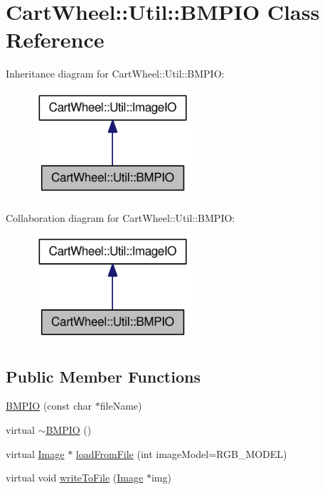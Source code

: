 \hypertarget{classCartWheel_1_1Util_1_1BMPIO}{
\section{CartWheel::Util::BMPIO Class Reference}
\label{classCartWheel_1_1Util_1_1BMPIO}
}


Inheritance diagram for CartWheel::Util::BMPIO:\nopagebreak
\begin{figure}[H]
\begin{center}
\leavevmode
\includegraphics[width=166pt]{classCartWheel_1_1Util_1_1BMPIO__inherit__graph}
\end{center}
\end{figure}


Collaboration diagram for CartWheel::Util::BMPIO:\nopagebreak
\begin{figure}[H]
\begin{center}
\leavevmode
\includegraphics[width=166pt]{classCartWheel_1_1Util_1_1BMPIO__coll__graph}
\end{center}
\end{figure}
\subsection*{Public Member Functions}
\begin{DoxyCompactItemize}
\item 
\hyperlink{classCartWheel_1_1Util_1_1BMPIO_a2bbfc44eb983401f19bbc3ff4fa60e1b}{BMPIO} (const char $\ast$fileName)
\item 
virtual \hyperlink{classCartWheel_1_1Util_1_1BMPIO_a5b8f58a06502d178ccc7f97f165e6a82}{$\sim$BMPIO} ()
\item 
virtual \hyperlink{classCartWheel_1_1Util_1_1Image}{Image} $\ast$ \hyperlink{classCartWheel_1_1Util_1_1BMPIO_a1dd8a7208f86e519a8446c1e2eb55f51}{loadFromFile} (int imageModel=RGB\_\-MODEL)
\item 
virtual void \hyperlink{classCartWheel_1_1Util_1_1BMPIO_a5669139891fc0f0499c115c55c0b309b}{writeToFile} (\hyperlink{classCartWheel_1_1Util_1_1Image}{Image} $\ast$img)
\end{DoxyCompactItemize}
